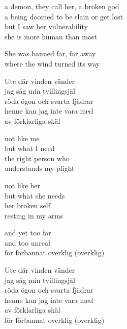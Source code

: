 \begin{lyrics}
a demon, they call her, a broken god\\
a being doomed to be slain or get lost\\
but I saw her vulnerability\\
she is more human than most

She was banned far, far away\\
where the wind turned its way

Ute där vinden vänder\\
jag såg min tvillingsjäl\\
röda ögon och svarta fjädrar\\
henne kan jag inte vara med\\
av förklarliga skäl

not like me\\
but what I need\\
the right person who\\
understands my plight

not like her\\
but what she needs\\
her broken self\\
resting in my arms

and yet too far\\
and too unreal\\
för förbannat overklig
(overklig)

Ute där vinden vänder\\
jag såg min tvillingsjäl\\
röda ögon och svarta fjädrar\\
henne kan jag inte vara med\\
av förklarliga skäl\\
för förbannat overklig
(overklig)
\end{lyrics}

